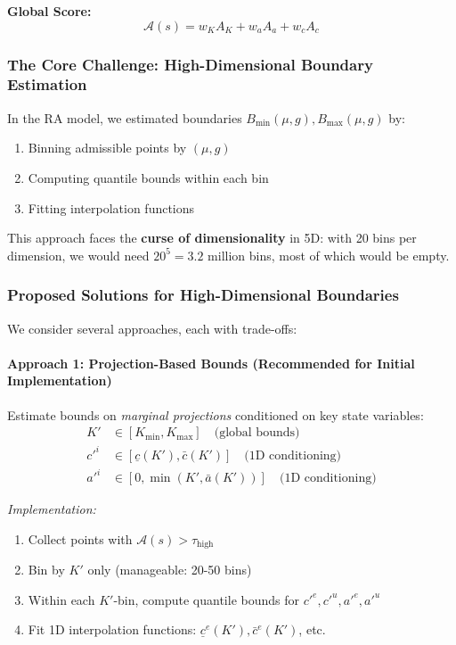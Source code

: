 \textbf{Global Score:}
\begin{equation}
    \mathcal{A}(s) = w_K A_K + w_a A_a + w_c A_c
\end{equation}

\subsubsection{The Core Challenge: High-Dimensional Boundary Estimation}

In the RA model, we estimated boundaries $B_{\min}(\mu, g), B_{\max}(\mu, g)$ by:
\begin{enumerate}
    \item Binning admissible points by $(\mu, g)$
    \item Computing quantile bounds within each bin
    \item Fitting interpolation functions
\end{enumerate}

This approach faces the \textbf{curse of dimensionality} in 5D: with 20 bins per dimension, we would need $20^5 = 3.2$ million bins, most of which would be empty.

\subsubsection{Proposed Solutions for High-Dimensional Boundaries}

We consider several approaches, each with trade-offs:

\paragraph{Approach 1: Projection-Based Bounds (Recommended for Initial Implementation)}

Estimate bounds on \textit{marginal projections} conditioned on key state variables:
\begin{align}
    K' &\in [K_{\min}, K_{\max}] \quad \text{(global bounds)} \\
    c'^i &\in [\underline{c}(K'), \bar{c}(K')] \quad \text{(1D conditioning)} \\
    a'^i &\in [0, \min(K', \bar{a}(K'))] \quad \text{(1D conditioning)}
\end{align}

\textit{Implementation:}
\begin{enumerate}
    \item Collect points with $\mathcal{A}(s) > \tau_{\text{high}}$
    \item Bin by $K'$ only (manageable: 20-50 bins)
    \item Within each $K'$-bin, compute quantile bounds for $c'^e, c'^u, a'^e, a'^u$
    \item Fit 1D interpolation functions: $\underline{c}^e(K'), \bar{c}^e(K')$, etc.
\end{enumerate}


